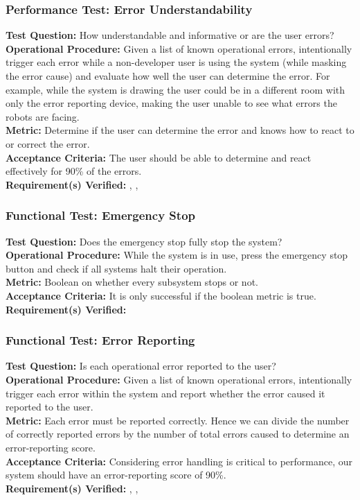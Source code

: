 \subsubsection{Performance Test: Error Understandability}
\label{sec:ui_pt_error_understand}
\textbf{Test Question:} How understandable and informative or are the user errors?\\
\textbf{Operational Procedure:} Given a list of known operational errors, intentionally trigger each error while a non-developer user is using the system (while masking the error cause) and evaluate how well the user can determine the error. For example, while the system is drawing the user could be in a different room with only the error reporting device, making the user unable to see what errors the robots are facing.\\
\textbf{Metric:}  Determine if the user can determine the error and knows how to react to or correct the error. \\
\textbf{Acceptance Criteria:}  The user should be able to determine and react effectively for 90\% of the errors.\\
\textbf{Requirement(s) Verified:} , , 

\subsubsection{Functional Test: Emergency Stop}
\label{sec:ui_ft_emergency_stop}
\textbf{Test Question:} Does the emergency stop fully stop the system? \\
\textbf{Operational Procedure:} While the system is in use, press the emergency stop button and check if all systems halt their operation. \\
\textbf{Metric:} Boolean on whether every subsystem stops or not. \\
\textbf{Acceptance Criteria:} It is only successful if the boolean metric is true. \\
\textbf{Requirement(s) Verified:}  

\subsubsection{Functional Test: Error Reporting}
\label{sec:ui_ft_error_reporting}
\textbf{Test Question:} Is each operational error reported to the user? \\
\textbf{Operational Procedure:} Given a list of known operational errors, intentionally trigger each error within the system and report whether the error caused it reported to the user. \\
\textbf{Metric:} Each error must be reported correctly. Hence we can divide the number of correctly reported errors by the number of total errors caused to determine an error-reporting score.  \\
\textbf{Acceptance Criteria:} Considering error handling is critical to performance, our system should have an error-reporting score of 90\%. \\
\textbf{Requirement(s) Verified:} , , 

